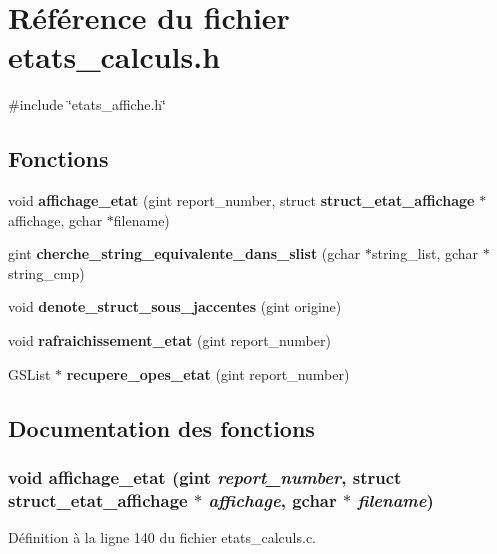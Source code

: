 \section{Référence du fichier etats\_\-calculs.h}
\label{etats__calculs_8h}
{\ttfamily \#include \char`\"{}etats\_\-affiche.h\char`\"{}}\par
\subsection*{Fonctions}
\begin{DoxyCompactItemize}
\item 
void {\bf affichage\_\-etat} (gint report\_\-number, struct {\bf struct\_\-etat\_\-affichage} $\ast$affichage, gchar $\ast$filename)
\item 
gint {\bf cherche\_\-string\_\-equivalente\_\-dans\_\-slist} (gchar $\ast$string\_\-list, gchar $\ast$string\_\-cmp)
\item 
void {\bf denote\_\-struct\_\-sous\_\-jaccentes} (gint origine)
\item 
void {\bf rafraichissement\_\-etat} (gint report\_\-number)
\item 
GSList $\ast$ {\bf recupere\_\-opes\_\-etat} (gint report\_\-number)
\end{DoxyCompactItemize}


\subsection{Documentation des fonctions}
\subsubsection[{affichage\_\-etat}]{\setlength{\rightskip}{0pt plus 5cm}void affichage\_\-etat (gint {\em report\_\-number}, \/  struct {\bf struct\_\-etat\_\-affichage} $\ast$ {\em affichage}, \/  gchar $\ast$ {\em filename})}\label{etats__calculs_8h_ab2abfe27729153161fd891d3e3f79483}


Définition à la ligne 140 du fichier etats\_\-calculs.c.

